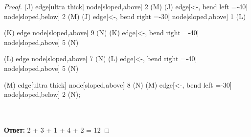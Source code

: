 \begin{proof}
{    (J) edge[ultra thick] node[sloped,above] {2} (M)
    (J) edge[<-, bend left =-40] node[sloped,below] {2} (M)
    (J) edge[<-, bend right =-30] node[sloped,above] {1} (L)
    
    (K) edge node[sloped,above] {9} (N)
    (K) edge[<-, bend right =-40] node[sloped,above] {5} (N)
    
    (L) edge node[sloped,above] {7} (N)
    (L) edge[<-, bend right =-40] node[sloped,above] {5} (N)
    
    (M) edge[ultra thick] node[sloped,above] {8} (N)
    (M) edge[<-, bend left =-30] node[sloped,below] {2} (N);
    }\\\\
    \textbf{Ответ:} 2 + 3 + 1 + 4 + 2 = 12
\end{proof}